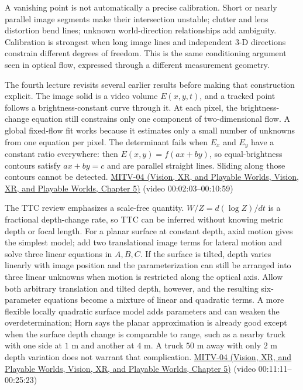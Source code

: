 A vanishing point is not automatically a precise calibration. Short or nearly parallel image segments make their intersection unstable; clutter and lens distortion bend lines; unknown world-direction relationships add ambiguity. Calibration is strongest when long image lines and independent 3-D directions constrain different degrees of freedom. This is the same conditioning argument seen in optical flow, expressed through a different measurement geometry.

The fourth lecture revisits several earlier results before making that construction explicit. The image solid is a video volume \(E(x,y,t)\), and a tracked point follows a brightness-constant curve through it. At each pixel, the brightness-change equation still constrains only one component of two-dimensional flow. A global fixed-flow fit works because it estimates only a small number of unknowns from one equation per pixel. The determinant fails when \(E_x\) and \(E_y\) have a constant ratio everywhere: then \(E(x,y)=f(ax+by)\), so equal-brightness contours satisfy \(ax+by=c\) and are parallel straight lines. Sliding along those contours cannot be detected. \href{../07-Vision-XR-and-Playable-Worlds/main.pdf\#nameddest=04-visual-computing-ii-ch036-mitv-04---fixed-optical-flow-optical-mouse-constant-brightness-assumption-closed-form-solution}{MITV-04 (Vision, XR, and Playable Worlds, Vision, XR, and Playable Worlds, Chapter 5)} (video 00:02:03--00:10:59)

The TTC review emphasizes a scale-free quantity. \(W/Z=d(\log Z)/dt\) is a fractional depth-change rate, so TTC can be inferred without knowing metric depth or focal length. For a planar surface at constant depth, axial motion gives the simplest model; add two translational image terms for lateral motion and solve three linear equations in \(A,B,C\). If the surface is tilted, depth varies linearly with image position and the parameterization can still be arranged into three linear unknowns when motion is restricted along the optical axis. Allow both arbitrary translation and tilted depth, however, and the resulting six-parameter equations become a mixture of linear and quadratic terms. A more flexible locally quadratic surface model adds parameters and can weaken the overdetermination; Horn says the planar approximation is already good except when the surface depth change is comparable to range, such as a nearby truck with one side at \(1\) m and another at \(4\) m. A truck \(50\) m away with only \(2\) m depth variation does not warrant that complication. \href{../07-Vision-XR-and-Playable-Worlds/main.pdf\#nameddest=04-visual-computing-ii-ch036-mitv-04---fixed-optical-flow-optical-mouse-constant-brightness-assumption-closed-form-solution}{MITV-04 (Vision, XR, and Playable Worlds, Vision, XR, and Playable Worlds, Chapter 5)} (video 00:11:11--00:25:23)

